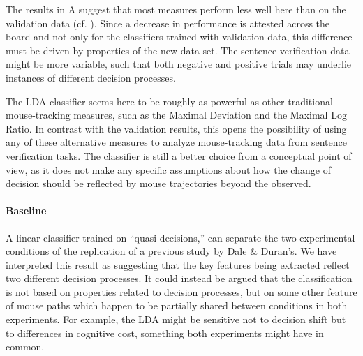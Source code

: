 \documentclass[draft]{article}
\begin{document}
The results in A suggest that most measures perform less well here than on the validation data (cf. ). 
Since a decrease in performance is attested across the board and not only for the classifiers trained with validation data, this difference must be driven by properties of the new data set. The sentence-verification data might be more variable, such that both negative and positive trials may underlie instances of different decision processes. 

The LDA classifier seems here to be roughly as powerful as other traditional mouse-tracking measures, such as the Maximal Deviation and the Maximal Log Ratio. In contrast with the validation results, this opens the possibility of using any of these alternative measures to analyze mouse-tracking data from sentence verification tasks. The classifier is still a better choice from a conceptual point of view, as it does not make any specific assumptions about how the change of decision should be reflected by mouse trajectories beyond the observed.

\paragraph{Baseline}
A linear classifier trained on ``quasi-decisions,'' can separate the two experimental conditions of the replication of a previous study by Dale \& Duran's. We have interpreted this result as suggesting that the key features being extracted reflect two different decision processes. It could instead be argued that the classification is not based on properties related to decision processes, but on some other feature of mouse paths which happen to be partially shared between conditions in both experiments. 
For example, the LDA might  be sensitive not to decision shift but to differences in cognitive cost, something both experiments might have in common.
\end{document}
